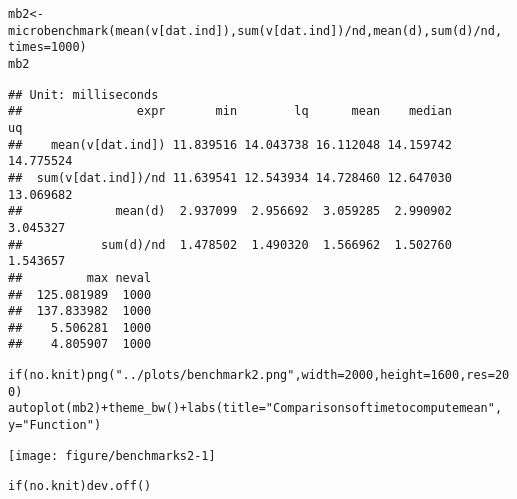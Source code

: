 \documentclass{article}\usepackage[]{graphicx}\usepackage[]{color}
\makeatletter
\def\maxwidth{ %
  \ifdim\Gin@nat@width>\linewidth
    \linewidth
  \else
    \Gin@nat@width
  \fi
}
\newcommand{\hlnum}[1]{\textcolor[rgb]{0.863,0.196,0.184}{#1}}%
\newcommand{\hlstr}[1]{\textcolor[rgb]{0.863,0.196,0.184}{#1}}%
\newcommand{\hlopt}[1]{\textcolor[rgb]{0.576,0.631,0.631}{#1}}%
\newcommand{\hlstd}[1]{\textcolor[rgb]{0.514,0.58,0.588}{#1}}%
\newcommand{\hlkwa}[1]{\textcolor[rgb]{0.796,0.294,0.086}{#1}}%
\newcommand{\hlkwb}[1]{\textcolor[rgb]{0.522,0.6,0}{#1}}%
\newcommand{\hlkwc}[1]{\textcolor[rgb]{0.796,0.294,0.086}{#1}}%
\newcommand{\hlkwd}[1]{\textcolor[rgb]{0.576,0.631,0.631}{#1}}%
\newenvironment{kframe}{%
 \def\at@end@of@kframe{}%
 \ifinner\ifhmode%
  \def\at@end@of@kframe{\end{minipage}}%
  \begin{minipage}{\columnwidth}%
 \fi\fi%
 \def\FrameCommand##1{\hskip\@totalleftmargin \hskip-\fboxsep
 \colorbox{shadecolor}{##1}\hskip-\fboxsep
     \hskip-\linewidth \hskip-\@totalleftmargin \hskip\columnwidth}%
 \MakeFramed {\advance\hsize-\width
   \@totalleftmargin\z@ \linewidth\hsize
   \@setminipage}}%
 {\par\unskip\endMakeFramed%
 \at@end@of@kframe}
\newenvironment{knitrout}{}{} %
\makeatother
\begin{document}
\begin{knitrout}
\color{fgcolor}\begin{kframe}
\begin{alltt}
\hlstd{mb2} \hlkwb{<-} \hlkwd{microbenchmark}\hlstd{(}\hlkwd{mean}\hlstd{(v[dat.ind]),} \hlkwd{sum}\hlstd{(v[dat.ind])}\hlopt{/}\hlstd{nd,} \hlkwd{mean}\hlstd{(d),} \hlkwd{sum}\hlstd{(d)}\hlopt{/}\hlstd{nd,}
    \hlkwc{times} \hlstd{=} \hlnum{1000}\hlstd{)}
\hlstd{mb2}
\end{alltt}
\begin{verbatim}
## Unit: milliseconds
##                expr       min        lq      mean    median        uq
##    mean(v[dat.ind]) 11.839516 14.043738 16.112048 14.159742 14.775524
##  sum(v[dat.ind])/nd 11.639541 12.543934 14.728460 12.647030 13.069682
##             mean(d)  2.937099  2.956692  3.059285  2.990902  3.045327
##           sum(d)/nd  1.478502  1.490320  1.566962  1.502760  1.543657
##         max neval
##  125.081989  1000
##  137.833982  1000
##    5.506281  1000
##    4.805907  1000
\end{verbatim}
\begin{alltt}
\hlkwa{if} \hlstd{(no.knit)} \hlkwd{png}\hlstd{(}\hlstr{"../plots/benchmark2.png"}\hlstd{,} \hlkwc{width} \hlstd{=} \hlnum{2000}\hlstd{,} \hlkwc{height} \hlstd{=} \hlnum{1600}\hlstd{,} \hlkwc{res} \hlstd{=} \hlnum{200}\hlstd{)}
\hlkwd{autoplot}\hlstd{(mb2)} \hlopt{+} \hlkwd{theme_bw}\hlstd{()} \hlopt{+} \hlkwd{labs}\hlstd{(}\hlkwc{title} \hlstd{=} \hlstr{"Comparisons of time to compute mean"}\hlstd{,}
    \hlkwc{y} \hlstd{=} \hlstr{"Function"}\hlstd{)}
\end{alltt}
\end{kframe}
\texttt{[image: figure/benchmarks2-1]} 
\begin{kframe}\begin{alltt}
\hlkwa{if} \hlstd{(no.knit)} \hlkwd{dev.off}\hlstd{()}
\end{alltt}
\end{kframe}
\end{knitrout}
\end{document}
